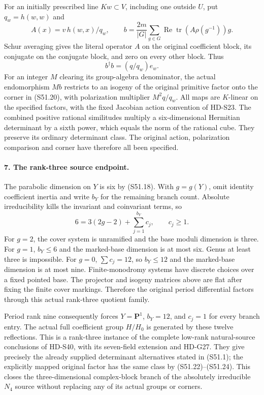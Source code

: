 For an initially prescribed line \(Kw\subset V\), including
one outside \(U\), put \(q_w=h(w,w)\) and
\[
 A(x)=v\,h(w,x)/q_w,\qquad
 b=\frac{2m}{|G|}\sum_{g\in G}
       \operatorname{Re}\operatorname{tr}(A\rho(g^{-1}))g.
                                                               \tag{S51.23}
\]
Schur averaging gives the literal operator \(A\) on the
original coefficient block, its conjugate on the conjugate
block, and zero on every other block. Thus
\[
                         b^\dagger b=(q/q_w)e_w.           \tag{S51.24}
\]
For an integer \(M\) clearing its group-algebra denominator,
the actual endomorphism \(Mb\) restricts to an isogeny of
the original primitive factor onto the corner in (S51.20),
with polarization multiplier \(M^2q/q_w\). All maps are
\(K\)-linear on the specified factors, with the fixed
Jacobian action convention of HD-S23. The combined positive
rational similitudes multiply a six-dimensional Hermitian
determinant by a sixth power, which equals the norm of the
rational cube. They preserve its ordinary determinant class.
The original action, polarization comparison and corner have
therefore all been specified.

\paragraph{7. The rank-three source endpoint.}
The parabolic dimension on \(Y\) is six by (S51.18).
With \(g=g(Y)\), omit identity coefficient inertia and write
\(b_Y\) for the remaining branch count. Absolute irreducibility
kills the invariant and coinvariant terms, so
\[
               6=3(2g-2)+\sum_{j=1}^{b_Y}c_j,
                             \qquad c_j\ge1.               \tag{S51.25}
\]
For \(g=2\), the cover system is unramified and the base
moduli dimension is three. For \(g=1\), \(b_Y\le6\) and
the marked-base dimension is at most six. Genus at least three
is impossible. For \(g=0\), \(\sum c_j=12\), so
\(b_Y\le12\) and the marked-base dimension is at most nine.
Finite-monodromy systems have discrete choices over a fixed
pointed base. The projector and isogeny matrices above are
flat after fixing the finite cover markings. Therefore the
original period differential factors through this actual
rank-three quotient family.

Period rank nine consequently forces \(Y=\mathbf P^1\),
\(b_Y=12\), and \(c_j=1\) for every branch entry. The
actual full coefficient group \(H/H_0\) is generated by
these twelve reflections. This is a rank-three instance of
the complete low-rank natural-source conclusions of HD-S40,
with its seven-field extension and HD-G27. They give precisely
the already supplied determinant alternatives stated in
(S51.1); the explicitly mapped original factor has the same
class by (S51.22)--(S51.24). This closes the three-dimensional
complex-block branch of the absolutely irreducible \(N_4\)
source without replacing any of its actual groups or corners.
